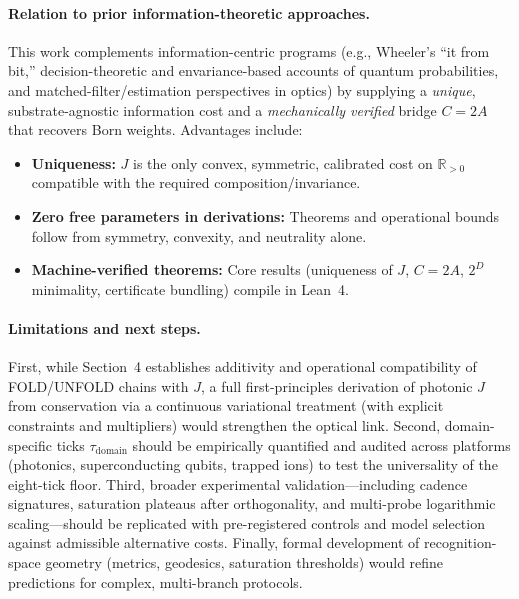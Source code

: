 \documentclass[12pt,a4paper]{article}
\begin{document}
\paragraph{Relation to prior information-theoretic approaches.}
This work complements information-centric programs (e.g., Wheeler’s “it from bit,” decision-theoretic and envariance-based accounts of quantum probabilities, and matched-filter/estimation perspectives in optics) by supplying a \emph{unique}, substrate-agnostic information cost and a \emph{mechanically verified} bridge $C=2A$ that recovers Born weights. Advantages include:
\begin{itemize}
  \item \textbf{Uniqueness:} $J$ is the only convex, symmetric, calibrated cost on $\mathbb{R}_{>0}$ compatible with the required composition/invariance.
  \item \textbf{Zero free parameters in derivations:} Theorems and operational bounds follow from symmetry, convexity, and neutrality alone.
  \item \textbf{Machine-verified theorems:} Core results (uniqueness of $J$, $C{=}2A$, $2^{D}$ minimality, certificate bundling) compile in Lean~4.
\end{itemize}

\paragraph{Limitations and next steps.}
First, while Section~4 establishes additivity and operational compatibility of FOLD/UNFOLD chains with $J$, a full first-principles derivation of photonic $J$ from conservation via a continuous variational treatment (with explicit constraints and multipliers) would strengthen the optical link. Second, domain-specific ticks $\tau_{\mathrm{domain}}$ should be empirically quantified and audited across platforms (photonics, superconducting qubits, trapped ions) to test the universality of the eight-tick floor. Third, broader experimental validation—including cadence signatures, saturation plateaus after orthogonality, and multi-probe logarithmic scaling—should be replicated with pre-registered controls and model selection against admissible alternative costs. Finally, formal development of recognition-space geometry (metrics, geodesics, saturation thresholds) would refine predictions for complex, multi-branch protocols.
\end{document}
